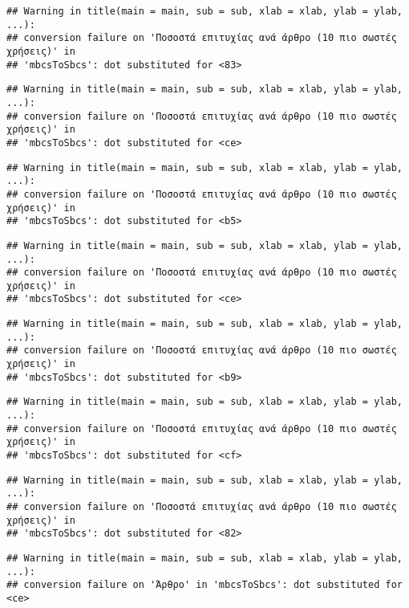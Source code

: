 \documentclass[
]{article}
\begin{document}
\begin{verbatim}
## Warning in title(main = main, sub = sub, xlab = xlab, ylab = ylab, ...):
## conversion failure on 'Ποσοστά επιτυχίας ανά άρθρο (10 πιο σωστές χρήσεις)' in
## 'mbcsToSbcs': dot substituted for <83>
\end{verbatim}

\begin{verbatim}
## Warning in title(main = main, sub = sub, xlab = xlab, ylab = ylab, ...):
## conversion failure on 'Ποσοστά επιτυχίας ανά άρθρο (10 πιο σωστές χρήσεις)' in
## 'mbcsToSbcs': dot substituted for <ce>
\end{verbatim}

\begin{verbatim}
## Warning in title(main = main, sub = sub, xlab = xlab, ylab = ylab, ...):
## conversion failure on 'Ποσοστά επιτυχίας ανά άρθρο (10 πιο σωστές χρήσεις)' in
## 'mbcsToSbcs': dot substituted for <b5>
\end{verbatim}

\begin{verbatim}
## Warning in title(main = main, sub = sub, xlab = xlab, ylab = ylab, ...):
## conversion failure on 'Ποσοστά επιτυχίας ανά άρθρο (10 πιο σωστές χρήσεις)' in
## 'mbcsToSbcs': dot substituted for <ce>
\end{verbatim}

\begin{verbatim}
## Warning in title(main = main, sub = sub, xlab = xlab, ylab = ylab, ...):
## conversion failure on 'Ποσοστά επιτυχίας ανά άρθρο (10 πιο σωστές χρήσεις)' in
## 'mbcsToSbcs': dot substituted for <b9>
\end{verbatim}

\begin{verbatim}
## Warning in title(main = main, sub = sub, xlab = xlab, ylab = ylab, ...):
## conversion failure on 'Ποσοστά επιτυχίας ανά άρθρο (10 πιο σωστές χρήσεις)' in
## 'mbcsToSbcs': dot substituted for <cf>
\end{verbatim}

\begin{verbatim}
## Warning in title(main = main, sub = sub, xlab = xlab, ylab = ylab, ...):
## conversion failure on 'Ποσοστά επιτυχίας ανά άρθρο (10 πιο σωστές χρήσεις)' in
## 'mbcsToSbcs': dot substituted for <82>
\end{verbatim}

\begin{verbatim}
## Warning in title(main = main, sub = sub, xlab = xlab, ylab = ylab, ...):
## conversion failure on 'Άρθρο' in 'mbcsToSbcs': dot substituted for <ce>
\end{verbatim}
\end{document}
